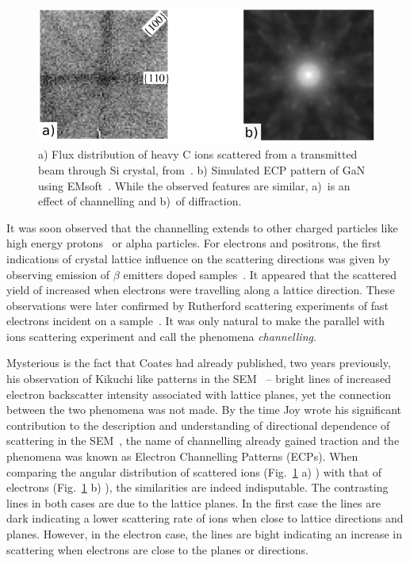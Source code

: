 \begin{figure}[!h]
    \centering
\includegraphics[width=0.66\linewidth]{Figures/icp-ecp.png}
\caption[Ion channelling.]{ a) Flux distribution of heavy C ions scattered from a transmitted beam through \hkl[001] Si crystal, from~\cite{Assmann99}. b) Simulated ECP pattern of \hkl[001] GaN using EMsoft~\cite{EMsoft}. While the observed features are similar, a)~is an effect of channelling and b)~of diffraction.}
\label{Fig:icp}
\end{figure}





It was soon observed that the channelling extends to other charged particles like high energy protons~\cite{Dearnaley68} or alpha particles. For electrons and positrons, the first indications of crystal lattice influence on the scattering directions was given by observing emission of $\beta$ emitters doped samples~\cite{Uggerhoj68}. It appeared that the scattered yield of increased when electrons were travelling along a lattice direction. These observations were later confirmed by Rutherford scattering experiments of fast electrons incident on a sample~\cite{Uggerhoj69}. It was only natural to make the parallel with ions scattering experiment and call the phenomena \textit{channelling}.  

Mysterious is the fact that Coates had already published, two years previously, his observation of Kikuchi like patterns in the SEM~\cite{Coates67} -- bright lines of increased electron backscatter intensity associated with lattice planes, yet the connection between the two phenomena was not made. By the time Joy wrote his significant contribution to the description and understanding of directional dependence of scattering in the SEM~\cite{Joy82}, the name of channelling already gained traction and the phenomena was known as Electron Channelling Patterns (ECPs). When comparing the angular distribution of scattered ions (Fig.~\ref{Fig:icp} a) ) with that of electrons (Fig.~\ref{Fig:icp} b) ), the similarities are indeed indisputable. The contrasting lines in both cases are due to the lattice planes. In the first case the lines are dark indicating a lower scattering rate of ions when close to lattice directions and planes. However, in the electron case, the lines are bight indicating an increase in scattering when electrons are close to the planes or directions. 

